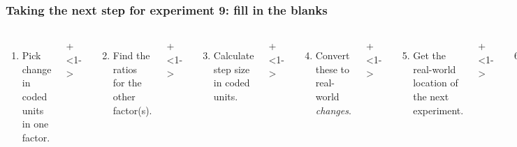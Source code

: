 \begin{frame}\frametitle{Taking the next step for experiment 9: {\color{myOrange}fill in the blanks}}
	\begin{columns}[T]
		
			\vspace{0.1cm}
			{\tiny 
				\begin{enumerate}
					\item	Pick change in coded units in one factor.
				\end{enumerate}
			 \par}
			 
			\onslide+<1->{
				{\tiny 
					\begin{enumerate}\setcounter{enumi}{1}
						\item	Find the ratios for the other factor(s).
					\end{enumerate}
				
				\par}
			}
			
			\vspace{0.0cm}
			\onslide+<1->{
				{\tiny 
					\begin{enumerate}\setcounter{enumi}{2}
						\item	Calculate step size in coded units.
					\end{enumerate}
				
				\par}
			}
			
			\onslide+<1->{
				{\tiny 
					\begin{enumerate}\setcounter{enumi}{3}
						\item	Convert these to real-world \emph{changes}.
					\end{enumerate}
				
				\par}
			}
			
			\onslide+<1->{
				{\tiny 
					\begin{enumerate}\setcounter{enumi}{4}
						\item	Get the real-world location
						of the next experiment.
					\end{enumerate}
				
				\par}
			}
			
			
			\vspace{-0.2cm}
			\onslide+<1->{
				{\tiny 
					\begin{enumerate}\setcounter{enumi}{5}
						\item	Convert these back to coded-units.
					\end{enumerate}
				
}}
\end{columns}
\end{frame}
